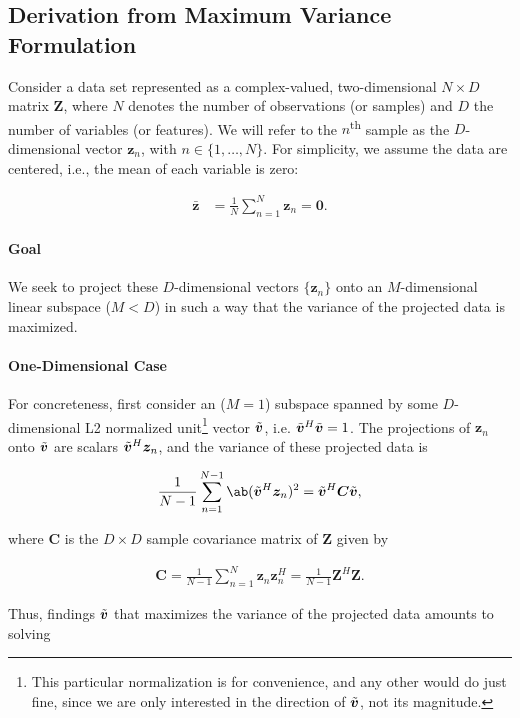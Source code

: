\subsection{Derivation from Maximum Variance Formulation}\label{sec:theory:pca_derivation}
Consider a data set represented as a complex-valued, two-dimensional $N\times D$ matrix $\bm{Z}$, where $N$ denotes the number of observations (or samples) and $D$ the number of variables (or features). We will refer to the $n$\textsuperscript{th} sample as the $D$-dimensional vector $\bm{z}_n$, with $n\in\{1,\dots,N\}$. For simplicity, we assume the data are centered, i.e., the mean of each variable is zero: 

\begin{align}
    \bar{\bm{z}} &= \frac{1}{N} \sum_{n=1}^{N} \bm{z}_n = \bm{0}.
\end{align}


\paragraph{Goal} We seek to project these $D$-dimensional vectors $\{\bm{z}_n\}$ onto an $M$-dimensional linear subspace ($M<D$) in such a way that the variance of the projected data is maximized.

\paragraph{One-Dimensional Case} For concreteness, first consider an ($M=1$) subspace spanned by some $D$-dimensional L2 normalized unit\footnote{This particular normalization is for convenience, and any other would do just fine, since we are only interested in the direction of $\tilde{\bm{v}}$, not its magnitude.} vector $\tilde{\bm{v}}$, i.e. $\tilde{\bm{v}}^H\tilde{\bm{v}}=1$. The projections of $\bm{z}_n$ onto $\tilde{\bm{v}}$ are scalars $\tilde{\bm{v}}^H\bm{z}_n$, and the variance of these projected data is

\begin{align}
    \frac{1}{N-1} \sum_{n=1}^{N-1} \ab( \bmn{v}^H\bm{z}_n )^2 = \bmn{v}^H\bm{C}\bmn{v},
\end{align}

where $\bm{C}$ is the $D\times D$ sample covariance matrix of $\bm{Z}$ given by

\begin{align}
    \bm{C} = \frac{1}{N-1} \sum_{n=1}^{N} \bm{z}_n \bm{z}_n^H = \frac{1}{N-1} \bm{Z}^H \bm{Z}.
\end{align}

Thus, findings $\tilde{\bm{v}}$ that maximizes the variance of the projected data amounts to solving

